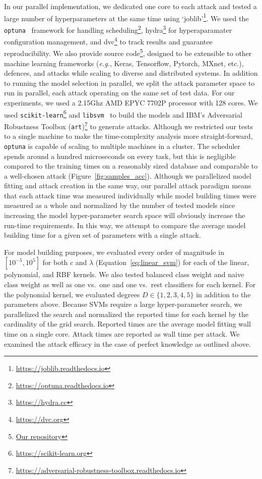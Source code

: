 \documentclass[fonts]{icst}
\begin{document}
In our parallel implementation, we dedicated one core to each attack and tested a large number of hyperparameters at the same time using `joblib'\footnote{\href{https://joblib.readthedocs.io}{https://joblib.readthedocs.io}}. We used the \texttt{optuna}~\cite{optuna} framework for handling scheduling\footnote{\href{https://optuna.readthedocs.io}{https://optuna.readthedocs.io}}, hydra\footnote{\href{https://hydra.cc}{https://hydra.cc}} for hyperaparamater configuration management, and dvc\footnote{\href{https://dvc.org}{https://dvc.org}} to track results and guarantee reproducibility. We also provide source code\footnote{\href{https://github.com/simplymathematics/deckard/}{Our repository}}, designed to be extensible to other machine learning frameworks (\textit{e.g.}, Keras, Tensorflow, Pytorch, MXnet, etc.), defences, and attacks while scaling to diverse and distributed systems. In addition to running the model selection in parallel, we split the attack parameter space to run in parallel, each attack operating on the same set of test data. For our experiments, we used a 2.15Ghz AMD EPYC 7702P processor with 128 cores. We used \texttt{scikit-learn}\footnote{\href{https://scikit-learn.org/}{https://scikit-learn.org}} and \texttt{libsvm}~\cite{chang2011libsvm} to build the models and IBM's Adversarial Robustness Toolbox (\texttt{art})\footnote{\href{https://adversarial-robustness-toolbox.readthedocs.io/}{https://adversarial-robustness-toolbox.readthedocs.io}} to generate attacks.  Although we restricted our tests to a single machine to make the time-complexity analysis more straight-forward, \texttt{optuna} is capable of scaling to multiple machines in a cluster. The scheduler spends around a hundred microseconds on every task, but this is negligible compared to the training times on a reasonably sized database and comparable to a well-chosen attack (Figure~\ref{fig:samples_acc}). Although we parallelized model fitting and attack creation in the same way, our parallel attack paradigm means that each attack time was measured individually while model building times were measured as a whole and normalized by the number of tested models since increasing the model hyper-parameter search space will obviously increase the run-time requirements. In this way, we attempt to compare the average model building time for a given set of parameters with a single attack.

For model building purposes, we evaluated every order of magnitude in $[10^{-5}, 10^5]$ for both $c$  and $\lambda$ (Equation~\ref{eq:linear_svm}) for each of the linear, polynomial, and RBF kernels. We also tested balanced class weight and naive class weight as well as one vs.~one and one vs.~rest classifiers for each kernel. For the polynomial kernel, we evaluated degrees $D\in\{1,2,3,4,5\}$ in addition to the parameters above. Because SVMs require a large hyper-parameter search, we parallelized the search and normalized the reported time for each kernel by the cardinality of the grid search. Reported times are the average model fitting  wall time on a single core. Attack times are reported as wall time per attack. We examined the attack efficacy in the case of perfect knowledge as outlined above.
\end{document}
